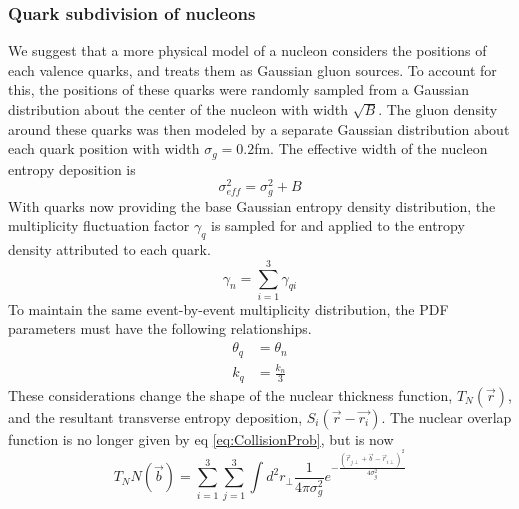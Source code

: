 \documentclass[twocolumn,showpacs,amsfonts,aps,prc,nofootinbib,floatfix]{revtex4}
\begin{document}
\subsubsection{Quark subdivision of nucleons}
\label{sec2b1}
We suggest that a more physical model of a nucleon considers the positions of each valence quarks, and treats them as Gaussian gluon sources. To account for this, the positions of these quarks were randomly sampled from a Gaussian distribution about the center of the nucleon with width $\sqrt{B}$. The gluon density around these quarks was then modeled by a separate Gaussian distribution about each quark position with width $\sigma_g=0.2$fm. The effective width of the nucleon entropy deposition is 
\begin{equation} 
	\label{eq:QuarkConstraint}
	\sigma_{eff}^2 = \sigma_g ^2+B
\end{equation}
With quarks now providing the base Gaussian entropy density distribution, the multiplicity fluctuation factor $\gamma_q$ is sampled for and applied to the entropy density attributed to each quark.
\begin{equation} 
	\gamma_n = \sum_{i=1}^{3} \gamma_{qi}
\end{equation}
To maintain the same event-by-event multiplicity distribution, the PDF parameters must have the following relationships.
\begin{align}
	\theta_q &= \theta_n\\
	k_q &=\frac{k_n}{3}
\end{align}
These considerations change the shape of the nuclear thickness function, $T_N(\vec{r})$, and the resultant transverse entropy deposition, $S_i(\vec{r}-\vec{r_i})$. The nuclear overlap function is no longer given by eq \ref{eq:CollisionProb}, but is now
\begin{equation}
	T_NN(\vec{b}) = \sum_{i=1}^{3}\sum_{j=1}^{3}\int{d^2r_\perp \frac{1}{4 \pi \sigma_g^2} e^{-\frac{(\vec{r}_{j\perp}+\vec{b}-\vec{r}_{i\perp})^2}{4 \sigma_g^2}}}
\end{equation}
\end{document}
